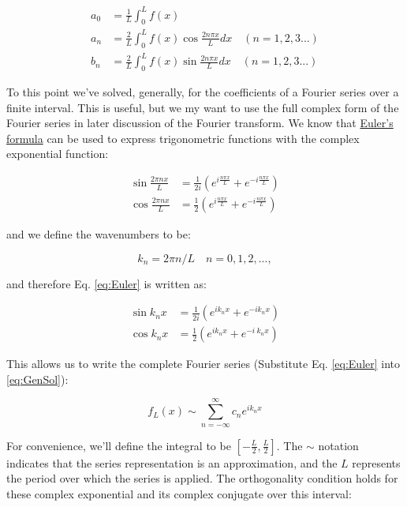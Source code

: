 \begin{align}
	a_0 &= \frac{1}{L} \int_0^L f(x)\\
		a_n &= \frac{2}{L} \int_0^L f(x)\cos{\frac{2 n \pi x}{L}}dx \quad (n = 1,2,3...)\\
			b_n &= \frac{2}{L} \int_0^L f(x)\sin{\frac{2 n \pi x}{L}}dx\quad (n = 1,2,3...)
\end{align}

To this point we've solved, generally, for the coefficients of a Fourier series over a finite interval. This is useful, but we my want to use the full complex form of the Fourier series in later discussion of the Fourier transform. We know that \href{https://en.wikipedia.org/wiki/Euler's_formula#Relationship_to_trigonometry}{Euler's formula} can be used to express trigonometric functions with the complex exponential function:

\begin{align}
	\sin{\frac{2 \pi n x}{L}} &= \frac{1}{2i}\left(e^{i\frac{n \pi x}{L}}+e^{-i\frac{n \pi x}{L}}\right) \nonumber \\
	\cos{\frac{2 \pi n x}{L}} &= \frac{1}{2}\left(e^{i\frac{n \pi x}{L}}+e^{-i\frac{n \pi x}{L}}\right) \label{eq:Euler}
\end{align}

and we define the wavenumbers to be:

\begin{equation}
	k_n = 2 \pi n/L \quad n=0,1,2,...,
\label{eq:Wavenumber}
\end{equation}

and therefore Eq. \ref{eq:Euler} is written as:

\begin{align}
	\sin{k_n x} &= \frac{1}{2i}\left(e^{i k_n x}+e^{-i k_n x}\right) \nonumber \\
	\cos{k_n x} &= \frac{1}{2}\left(e^{i k_n x}+e^{-i\ k_n x}\right) \label{eq:Euler}
\end{align}

This allows us to write the complete Fourier series (Substitute Eq. \ref{eq:Euler} into \ref{eq:GenSol}): 

\begin{equation}
	f_{L}(x) \sim \sum_{n=-\infty}^{\infty} c_n e^{i k_n x}
\label{eq:ComplexFourierSeries}
\end{equation}

For convenience, we'll define the integral to be $[-\frac{L}{2},\frac{L}{2}]$. The $\sim$ notation indicates that the series representation is an approximation, and the $L$ represents the period over which the series is applied. The orthogonality condition holds for these complex exponential and its complex conjugate over this interval:

